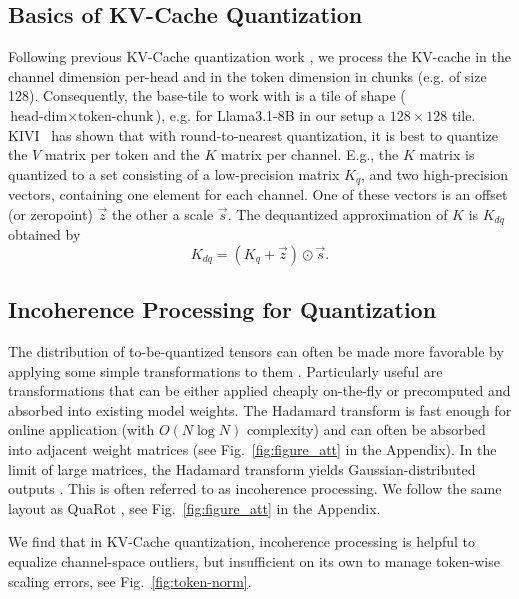 \documentclass{llmxive}
\begin{document}
\subsection{Basics of KV-Cache Quantization}
Following previous KV-Cache quantization work \cite{KIVI}, we process the KV-cache in the channel dimension per-head and in the token dimension in chunks (e.g. of size 128). Consequently, the base-tile to work with is a tile of shape ($\text{head-dim}\times \text{token-chunk}$), e.g. for Llama3.1-8B in our setup a $128\times128$ tile. KIVI~\cite{KIVI} has shown that with round-to-nearest quantization, it is best to  quantize the $V$ matrix per token and the $K$ matrix per channel. E.g., the $K$  matrix is quantized to a set consisting of a low-precision matrix $K_q$, and two high-precision vectors, containing one element for each channel. One of these vectors is an offset (or zeropoint) $\vec{z}$ the other a scale $\vec{s}$. The dequantized approximation of $K$ is $K_{dq}$ obtained by
\begin{equation}
    K_{dq} = (K_q + \vec{z}) \odot \vec{s}. 
\end{equation}


\subsection{Incoherence Processing for Quantization}
\label{sec:rotate}
The distribution of to-be-quantized tensors can often be made more favorable by applying some simple transformations to them \cite{ashkboos2024quarot, liu2025spinquant}. Particularly useful are transformations that can be either applied cheaply on-the-fly or precomputed and absorbed into existing model weights. The Hadamard transform is fast enough for online application (with $O(N \log N)$ complexity) and can often be absorbed into adjacent weight matrices (see Fig.~\ref{fig:figure_att} in the Appendix). In the limit of large matrices, the Hadamard transform yields Gaussian-distributed outputs \cite{malinovskii2025higgs, chee2023quip, tseng2024qtip}. This is often referred to as incoherence processing. We follow the same layout as QuaRot \cite{ashkboos2024quarot}, see Fig.~\ref{fig:figure_att} in the Appendix.

We find that in KV-Cache quantization, incoherence processing is helpful to equalize channel-space outliers, but insufficient on its own to manage token-wise scaling errors, see Fig.~\ref{fig:token-norm}.
\end{document}
